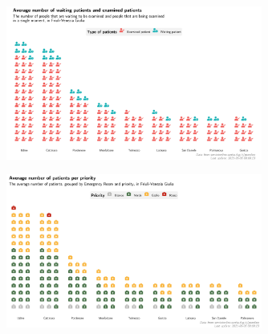 \documentclass[8pt,english,aspectratio=169]{beamer}
\begin{document}
\begin{frame}
\begin{figure}
  \centering
  \includegraphics[width=0.75\textwidth]{../images/08_waiting-examined_waffle.jpg}
\end{figure}
\end{frame}

\begin{frame}
\begin{figure}
  \centering
  \includegraphics[width=0.75\textwidth]{../images/09_priority_waffle.jpg}
\end{figure}
\end{frame}
\end{document}
